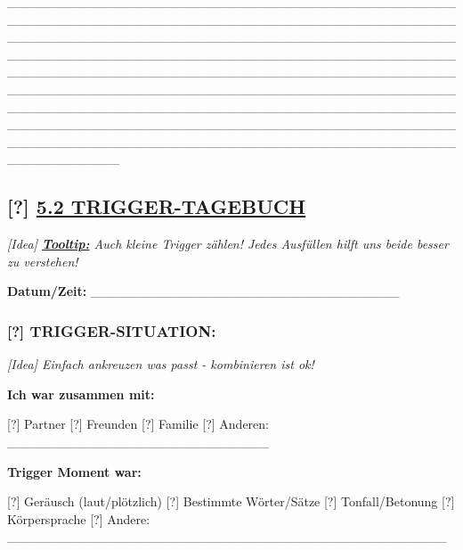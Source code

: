 \_\_\_\_\_\_\_\_\_\_\_\_\_\_\_\_\_\_\_\_\_\_\_\_\_\_\_\_\_\_\_\_\_\_\_\_\_\_\_\_\_\_\_\_\_\_\_\_\_\_\_\_\_\_\_\_\_\_\_\_\_\_\_\_\_\_\_\_\_\_\_\_\_\_\_\_\_\_\_\_\_\_\_\_\_\_\_\_\_\_\_\_\_\_\_\_\_\_\_\_\_\_\_\_\_\_\_\_\_\_\_\_\_\_\_\_\_\_\_\_\_\_\_\_\_\_\_\_\_\_\_\_\_\_\_\_\_\_\_\_\_\_\_\_\_\_\_\_\_\_\_\_\_\_\_\_\_\_\_\_\_\_\_\_\_\_\_\_\_\_\_\_\_\_\_\_\_\_\_\_\_\_\_\_\_\_\_\_\_\_\_\_\_\_\_\_\_\_\_\_\_\_\_\_\_\_\_\_\_\_\_\_\_\_\_\_\_\_\_\_\_\_\_\_\_\_\_\_\_\_\_\_\_\_\_\_\_\_\_\_\_\_\_\_\_\_\_\_\_\_\_\_\_\_\_\_\_\_\_\_\_\_\_\_\_\_\_\_\_\_\_\_\_\_\_\_\_\_\_\_\_\_\_\_\_\_\_\_\_\_\_\_\_\_\_\_\_\_\_\_\_\_\_\_\_\_\_\_\_\_\_\_\_\_\_\_\_\_\_\_\_\_\_\_\_\_\_\_\_\_\_\_\_\_\_\_\_\_\_\_\_\_\_\_\_\_\_\_\_\_\_\_\_\_\_\_\_\_\_\_\_\_\_\_\_\_\_\_\_\_\_\_\_\_\_\_\_\_\_\_\_\_\_\_\_\_\_\_\_\_\_\_\_\_\_\_\_\_\_\_\_\_\_\_\_\_\_\_\_\_\_\_\_\_\_\_\_\_\_\_\_\_\_\_\_\_\_\_\_\_\_\_\_\_\_\_\_\_\_\_\_\_\_\_

\hypertarget{section-2}{%
\subsection{}\label{section-2}}

\hypertarget{trigger-tagebuch}{%
\subsection{\texorpdfstring{[?] \textbf{\ul{5.2 TRIGGER-TAGEBUCH}}}{[?] 5.2 TRIGGER-TAGEBUCH}}\label{trigger-tagebuch}}

\emph{[Idea] \textbf{\ul{Tooltip:}} Auch kleine Trigger zählen! Jedes Ausfüllen hilft uns beide besser zu verstehen!}

\textbf{Datum/Zeit:} \_\_\_\_\_\_\_\_\_\_\_\_\_\_\_\_\_\_\_\_\_\_\_\_\_\_\_\_\_\_\_\_\_

\hypertarget{trigger-situation}{%
\subsubsection{\texorpdfstring{\textbf{[?] TRIGGER-SITUATION:}}{[?] TRIGGER-SITUATION:}}\label{trigger-situation}}

\emph{[Idea] Einfach ankreuzen was passt - kombinieren ist ok!}

\textbf{Ich war zusammen mit:}

[?] Partner [?] Freunden [?] Familie [?] Anderen: \_\_\_\_\_\_\_\_\_\_\_\_\_\_\_\_\_\_\_\_\_\_\_\_\_\_\_\_

\textbf{Trigger Moment war:}

[?] Geräusch (laut/plötzlich) [?] Bestimmte Wörter/Sätze [?] Tonfall/Betonung [?] Körpersprache [?] Andere: \_\_\_\_\_\_\_\_\_\_\_\_\_\_\_\_\_\_\_\_\_\_\_\_\_\_\_\_\_\_\_\_\_\_\_\_\_\_\_\_\_\_\_\_\_\_\_

